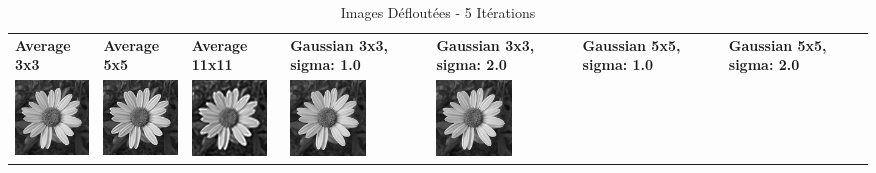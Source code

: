 \begin{table}[h!]
    \centering
    \captionsetup{justification=centering}
    \caption*{Images Défloutées - 5 Itérations}
    \begin{tabular}{>{\centering\arraybackslash} m{2cm} >{\centering\arraybackslash} m{2cm} >{\centering\arraybackslash} m{2cm} >{\centering\arraybackslash} m{2cm} >{\centering\arraybackslash} m{2cm} >{\centering\arraybackslash} m{2cm} >{\centering\arraybackslash} m{2cm}}
        \textbf{Average 3x3}                                                                            & \textbf{Average 5x5} & \textbf{Average 11x11} & \textbf{Gaussian 3x3, sigma: 1.0} & \textbf{Gaussian 3x3, sigma: 2.0} & \textbf{Gaussian 5x5, sigma: 1.0} & \textbf{Gaussian 5x5, sigma: 2.0} \\
        \includegraphics[width=2cm]{images/processed/flower/average_3x3/unblurred_5-iter.png}           &
        \includegraphics[width=2cm]{images/processed/flower/average_5x5/unblurred_5-iter.png}           &
        \includegraphics[width=2cm]{images/processed/flower/average_11x11/unblurred_5-iter.png}         &
        \includegraphics[width=2cm]{images/processed/flower/gaussian_3x3_sigma1.0/unblurred_5-iter.png} &
        \includegraphics[width=2cm]{images/processed/flower/gaussian_3x3_sigma2.0/unblurred_5-iter.png} &

\end{tabular}
\end{table}
